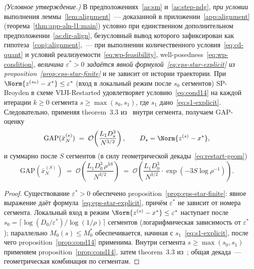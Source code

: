 \begin{theorem}
\label{thm:local-rate}
\emph{(Условное утверждение.)}
В предположениях~\ref{as:sm} и~\ref{as:step-ndg}, \emph{при условии}
выполнения леммы~\ref{lem:alignment}~--- доказанной в
приложении~\ref{app:alignment} (теорема~\ref{thm:app-aln-l1:main}) условно
при единственном дополнительном предположении~\ref{as:dir-align},
безусловный вывод которого зафиксирован как гипотеза~\ref{conj:alignment},~---
при выполнении количественного
условия~\eqref{eq:cd-quant} и условий
реализуемости~\eqref{eq:wp-feasibility}, well-posedness~\eqref{eq:wp-condition},
\emph{величина $\varepsilon^{*} > 0$ задаётся явной формулой~\eqref{eq:eps-star-explicit}
из proposition~\ref{prop:eps-star-finite}} и не зависит от истории
траектории. При $\Norm{z^{(s_0)} - x^{*}} \le \varepsilon^{*}$ (вход в
локальный режим после $s_0$ сегментов) SP-Broyden в схеме VIJI-Restarted
удовлетворяет условию~\eqref{eq:cond14} на каждой итерации $k \ge 0$
сегмента $s \ge \max(s_0, s_1)$, где $s_1$ дано~\eqref{eq:s1-explicit}.
Следовательно, применяя theorem~3.3 из~\cite{Agafonov2024VIJI} внутри сегмента,
получаем GAP-оценку
\[
\mathrm{GAP}(\bar x^{(s)}_N) \;=\; \mathcal O\!\left(\frac{L_1 D_s^3}{N^{3/2}}\right),
\qquad D_s = \Norm{z^{(s)} - x^{*}},
\]
и суммарно после $S$ сегментов (в силу геометрической декады~\eqref{eq:restart-geom})
\[
\mathrm{GAP}(\bar x^{(S)}_N)
\;=\;
\mathcal O\!\left(\frac{L_1 D_0^3 \,\rho^{3 S}}{N^{3/2}}\right)
\;=\;
\mathcal O\!\left(\frac{L_1 D_0^3}{N^{3/2}} \cdot \exp(-3 S \log\rho^{-1})\right).
\]
\end{theorem}

\begin{proof}
Существование $\varepsilon^{*} > 0$ обеспечено
proposition~\ref{prop:eps-star-finite}: явное выражение даёт
формула~\eqref{eq:eps-star-explicit}, причём $\varepsilon^{*}$ не
зависит от номера сегмента. Локальный вход в режим
$\Norm{z^{(s)} - x^{*}} \le \varepsilon^{*}$ наступает после
$s_0 = \lceil \log(D_0 / \varepsilon^{*}) / \log(1/\rho) \rceil$ сегментов
(логарифмическая зависимость от $\varepsilon^{*}$); параллельно
$M_0(s) \le M_0^{*}$ обеспечивается, начиная с
$s_1$~\eqref{eq:s1-explicit}, после чего proposition~\ref{prop:cond14}
применима. Внутри сегмента $s \ge \max(s_0, s_1)$ применяем
proposition~\ref{prop:cond14}, затем theorem~3.3
из~\cite{Agafonov2024VIJI}; общая декада~--- геометрическая комбинация
по сегментам.
\end{proof}

